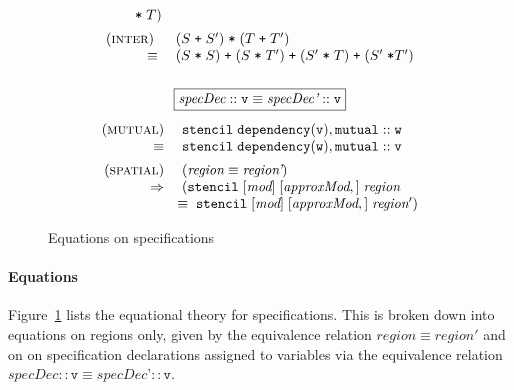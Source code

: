 \documentclass[9pt]{sigplanconf}
\theoremstyle{definition}
\begin{document}
\begin{figure}
\begin{align*}
\begin{array}{c}
\begin{array}{rll}
                       \; \texttt{*} \; T) \\[0.5em] 
(\textsc{inter}) \;\; & (S \; \texttt{+} \; S') \; \texttt{*} \;
                              (T \; \texttt{+} \; T') \\
 \equiv \; & (S \;  \texttt{*} \; S) 
 \; \texttt{+} \; (S \; \texttt{*} \; T') 
 \; \texttt{+} \; (S' \; \texttt{*} \; T)
 \; \texttt{+} \; (S' \; \texttt{*} T')  \\[0.5em] 
\end{array} \\ \\
%
\framebox{${\textit{specDec} :: \texttt{v}} \equiv 
{\textit{specDec'} :: \texttt{v}}$} \\[1em]
\begin{array}{rl}
(\textsc{mutual}) \; & 
\texttt{stencil} \; \texttt{dependency} (\texttt{v}), \texttt{mutual}
  :: \texttt{w} 
\\
\equiv \; & \texttt{stencil} \; \texttt{dependency} (\texttt{w}), \texttt{mutual} ::
  \texttt{v} \\[0.5em]
(\textsc{spatial}) \; &
(\textit{region} \equiv \textit{region'}) \\
\Rightarrow \; & (\texttt{stencil} \; [\textit{mod}] \; [\textit{approxMod},] \;
\textit{region} \\
& \!\!\equiv \; \texttt{stencil} \; [\textit{mod}] \;
            [\textit{approxMod},] \;
\textit{region}') \\
\end{array}
\end{array}
\end{align*}
\caption{Equations on specifications}
\label{fig:equations}
\end{figure}


\paragraph{Equations}
Figure~\ref{fig:equations} lists the equational theory for
specifications. This is broken down into equations on regions only,
given by the equivalence relation $\textit{region} \equiv \textit{region}'$ and on
on specification declarations assigned to variables via the equivalence relation
$\textit{specDec} :: \texttt{v} \equiv
\textit{specDec'} :: \texttt{v}$.
\end{document}
